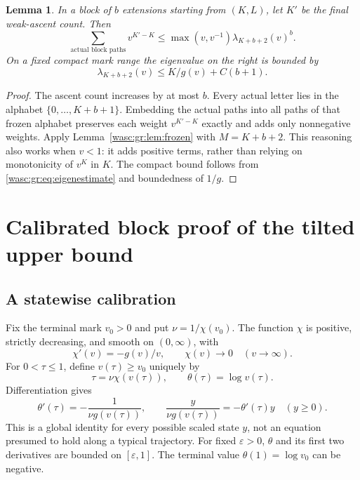 \documentclass[11pt,a4paper]{article}
\newtheorem{lemma}[theorem]{Lemma}
\theoremstyle{remark}\newtheorem{remark}[theorem]{Remark}
\numberwithin{equation}{section}
\begin{document}
\begin{lemma}\label{wasc:gr:lem:block}
In a block of $b$ extensions starting from $(K,L)$, let $K'$ be the final weak-ascent count. Then
\begin{equation}\label{wasc:gr:eq:block}
\sum_{\text{actual block paths}}v^{K'-K}
\le\max(v,v^{-1})\lambda_{K+b+2}(v)^b.
\end{equation}
On a fixed compact mark range the eigenvalue on the right is bounded by
\begin{equation}\label{wasc:gr:eq:blockeig}
\lambda_{K+b+2}(v)\le K/g(v)+C(b+1).
\end{equation}
\end{lemma}
\begin{proof}
The ascent count increases by at most $b$. Every actual letter lies in the alphabet $\{0,\ldots,K+b+1\}$. Embedding the actual paths into all paths of that frozen alphabet preserves each weight $v^{K'-K}$ exactly and adds only nonnegative weights. Apply Lemma~\ref{wasc:gr:lem:frozen} with $M=K+b+2$. This reasoning also works when $v<1$: it adds positive terms, rather than relying on monotonicity of $v^K$ in $K$. The compact bound follows from \eqref{wasc:gr:eq:eigenestimate} and boundedness of $1/g$.
\end{proof}

\section{Calibrated block proof of the tilted upper bound}\label{wasc:gr:sec:calibration}
\subsection{A statewise calibration}
Fix the terminal mark $v_0>0$ and put $\nu=1/\chi(v_0)$. The function $\chi$ is positive, strictly decreasing, and smooth on $(0,\infty)$, with
\[
\chi'(v)=-g(v)/v,\qquad \chi(v)\longrightarrow0\quad(v\to\infty).
\]
For $0<\tau\le1$, define $v(\tau)\ge v_0$ uniquely by
\begin{equation}\label{wasc:gr:eq:curve}
\tau=\nu\chi(v(\tau)),\qquad \theta(\tau)=\log v(\tau).
\end{equation}
Differentiation gives
\begin{equation}\label{wasc:gr:eq:calibration}
\theta'(\tau)=-\frac1{\nu g(v(\tau))},\qquad
\frac{y}{\nu g(v(\tau))}=-\theta'(\tau)y\quad(y\ge0).
\end{equation}
This is a global identity for every possible scaled state $y$, not an equation presumed to hold along a typical trajectory. For fixed $\varepsilon>0$, $\theta$ and its first two derivatives are bounded on $[\varepsilon,1]$. The terminal value $\theta(1)=\log v_0$ can be negative.
\end{document}
